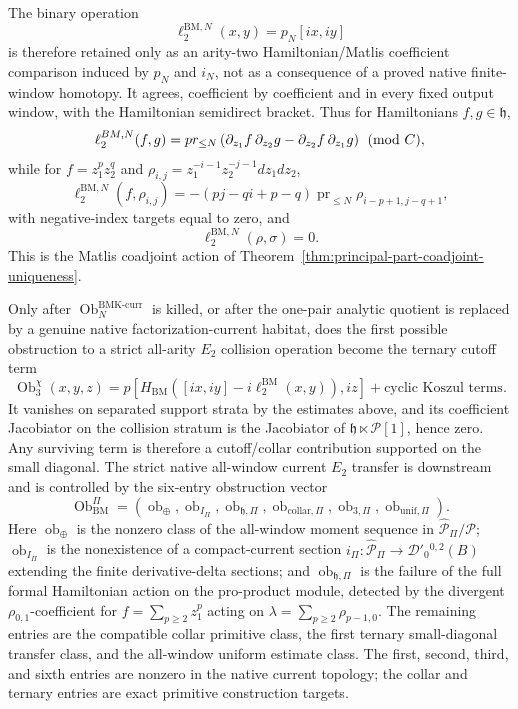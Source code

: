 \documentclass[11pt]{memoir}
\begin{document}
\begin{prop}
  The binary operation
  \[
    \ell_2^{\mathrm{BM},N}(x,y)=p_N[i x,i y]
  \]
  is therefore retained only as an arity-two Hamiltonian/Matlis
  coefficient comparison induced by \(p_N\) and \(i_N\), not as a
  consequence of a proved native finite-window homotopy.  It agrees,
  coefficient by coefficient and in every fixed output window, with the
  Hamiltonian semidirect bracket.  Thus for Hamiltonians
  \(f,g\in\mathfrak h\),
  \[
    \ell_2^{BM,N}(f,g)
      =
      pr_{\le N}
      \left(
      \partial_{z_1}f\,\partial_{z_2}g
      -
      \partial_{z_2}f\,\partial_{z_1}g
      \right)
      \pmod{C},
  \]
  while for \(f=z_1^pz_2^q\) and
  \(\rho_{i,j}=z_1^{-i-1}z_2^{-j-1}dz_1dz_2\),
  \[
    \ell_2^{\mathrm{BM},N}(f,\rho_{i,j})
      =
      -(pj-qi+p-q)\operatorname{pr}_{\le N}
      \rho_{i-p+1,j-q+1},
  \]
  with negative-index targets equal to zero, and
  \[
    \ell_2^{\mathrm{BM},N}(\rho,\sigma)=0 .
  \]
  This is the Matlis coadjoint action of
  Theorem~\ref{thm:principal-part-coadjoint-uniqueness}.

  Only after
  \(\operatorname{Ob}^{\mathrm{BMK\mbox{-}curr}}_N\) is killed, or after
  the one-pair analytic quotient is replaced by a genuine native
  factorization-current habitat, does the first possible obstruction to
  a strict all-arity \(E_2\) collision operation become the ternary cutoff
  term
  \[
    \operatorname{Ob}_3^\chi(x,y,z)
      =
      p[H_{\mathrm{BM}}([ix,iy]-i\ell_2^{\mathrm{BM}}(x,y)),iz]
      +\text{cyclic Koszul terms}.
  \]
  It vanishes on separated support strata by the estimates above, and
  its coefficient Jacobiator on the collision stratum is the Jacobiator
  of \(\mathfrak h\ltimes\mathcal P[1]\), hence zero.  Any surviving
  term is therefore a cutoff/collar contribution supported on the small
  diagonal.  The strict native all-window current \(E_2\) transfer is
  downstream and is controlled by the six-entry obstruction vector
  \[
    \operatorname{Ob}^{\Pi}_{\mathrm{BM}}
      =
      \left(
      \operatorname{ob}_{\oplus},
      \operatorname{ob}_{I_\Pi},
      \operatorname{ob}_{\mathfrak h,\Pi},
      \operatorname{ob}_{\mathrm{collar},\Pi},
      \operatorname{ob}_{3,\Pi},
      \operatorname{ob}_{\mathrm{unif},\Pi}
      \right).
  \]
  Here \(\operatorname{ob}_{\oplus}\) is the nonzero class of the
  all-window moment sequence in
  \(\widehat{\mathcal P}_{\Pi}/\mathcal P\);
  \(\operatorname{ob}_{I_\Pi}\) is the nonexistence of a compact-current
  section
  \(i_\Pi:\widehat{\mathcal P}_{\Pi}\to\mathcal D'_0{}^{0,2}(B)\)
  extending the finite derivative-delta sections; and
  \(\operatorname{ob}_{\mathfrak h,\Pi}\) is the failure of the full
  formal Hamiltonian action on the pro-product module, detected by the
  divergent \(\rho_{0,1}\)-coefficient for
  \(f=\sum_{p\ge2}z_1^p\) acting on
  \(\lambda=\sum_{p\ge2}\rho_{p-1,0}\).  The remaining entries are the
  compatible collar primitive class, the first ternary small-diagonal
  transfer class, and the all-window uniform estimate class.  The first,
  second, third, and sixth entries are nonzero in the native current
  topology; the collar and ternary entries are exact primitive
  construction targets.


\end{prop}
\end{document}

